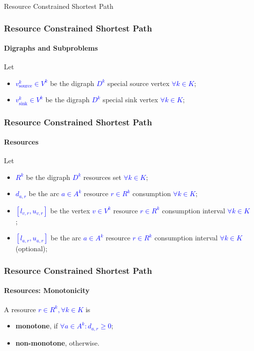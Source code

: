\begin{frame}
  \begin{center}
    \Huge Resource Constrained Shortest Path
  \end{center}
\end{frame}

\begin{frame}
  \frametitle{Resource Constrained Shortest Path}
  \framesubtitle{Digraphs and Subproblems}
  Let
  \begin{itemize}
    \item \textcolor{blue}{$v^k_{\text{source}} \in V^k$} be the digraph \textcolor{blue}{$D^k$} special source vertex \textcolor{blue}{$\forall k \in K$};
    \item \textcolor{blue}{$v^k_{\text{sink}} \in V^k$} be the digraph \textcolor{blue}{$D^k$} special sink vertex \textcolor{blue}{$\forall k \in K$};
  \end{itemize}
\end{frame}

\begin{frame}
  \frametitle{Resource Constrained Shortest Path}
  \framesubtitle{Resources}
  Let
  \begin{itemize}
    \item \textcolor{blue}{$R^k$} be the digraph \textcolor{blue}{$D^k$} resources set \textcolor{blue}{$\forall k \in K$};
    \item \textcolor{blue}{$d_{a,r}$} be the arc \textcolor{blue}{$a \in A^k$} resource \textcolor{blue}{$r \in R^k$} consumption \textcolor{blue}{$\forall k \in K$};
    \item \textcolor{blue}{$[l_{v,r}, u_{v,r}]$} be the vertex \textcolor{blue}{$v \in V^k$} resource \textcolor{blue}{$r \in R^k$} consumption interval \textcolor{blue}{$\forall k \in K$};
    \item \textcolor{blue}{$[l_{a,r}, u_{a,r}]$} be the arc \textcolor{blue}{$a \in A^k$} resource \textcolor{blue}{$r \in R^k$} consumption interval \textcolor{blue}{$\forall k \in K$} (optional);
  \end{itemize}
\end{frame}

\begin{frame}
  \frametitle{Resource Constrained Shortest Path}
  \framesubtitle{Resources: Monotonicity}
  A resource \textcolor{blue}{$r \in R^k, \forall k \in K$} is
  \begin{itemize}
    \item \textbf{monotone}, if \textcolor{blue}{$\forall a \in A^k : d_{a,r} \geqslant 0$};
    \item \textbf{non-monotone}, otherwise.
  \end{itemize}
\end{frame}


